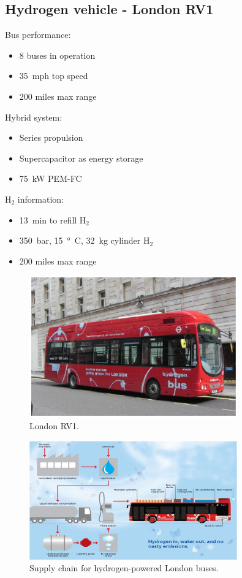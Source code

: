 \subsection{Hydrogen vehicle - London RV1}
Bus performance:
\begin{itemize}
    \item 8 buses in operation
    \item \SI{35}{mph} top speed
    \item 200 miles max range
\end{itemize}
Hybrid system:
\begin{itemize}
    \item Series propulsion
    \item Supercapacitor as energy storage
    \item \SI{75}{\kilo\watt} PEM-FC
\end{itemize}
H$_2$ information:
\begin{itemize}
    \item \SI{13}{min} to refill H$_2$
    \item \SI{350}{bar}, \SI{15}{\degree C}, \SI{32}{\kilo\gram} cylinder H$_2$
    \item 200 miles max range
\end{itemize}
\begin{figure}[H]
    \centering
    \includegraphics[width = 0.8\textwidth]{img/figure114.png}
    \caption{London RV1.}
\end{figure}
\begin{figure}[H]
    \centering
    \includegraphics[width = 0.8\textwidth]{img/figure115.png}
    \caption{Supply chain for hydrogen-powered London buses.}
\end{figure}